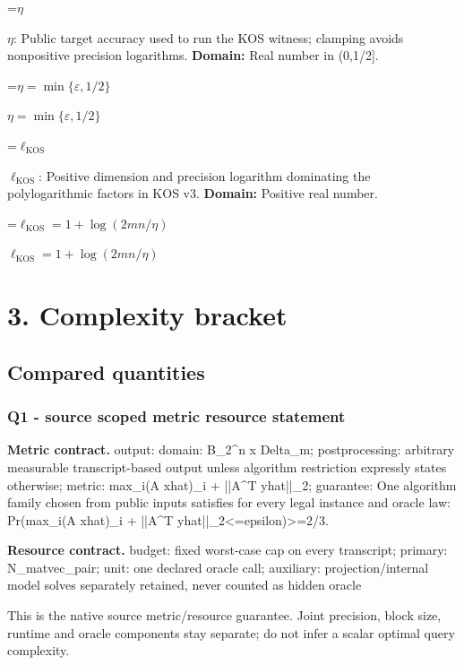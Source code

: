 \documentclass[10pt,a4paper]{article}
\newcommand{\AtlasMath}[1]{\par\begingroup\centering\setbox0=\hbox{$\displaystyle #1$}\ifdim\wd0>1.4\linewidth\typeout{ATLAS WIDE FORMULA: \the\wd0}\fi\ifdim\wd0>\linewidth\resizebox{\linewidth}{!}{\box0}\else\box0\fi\par\endgroup}
\newcommand{\AtlasInlineMath}[1]{\begingroup\setbox0=\hbox{$#1$}\ifdim\wd0>.4\linewidth\endgroup\AtlasMath{#1}\else\endgroup$#1$\fi}
\begin{document}
\AtlasInlineMath{\eta}: Public target accuracy used to run the KOS witness; clamping avoids nonpositive precision logarithms. \textbf{Domain:} Real number in (0,1/2].



\AtlasInlineMath{\eta=\min\{\varepsilon,1/2\}}



\AtlasInlineMath{\ell_{\mathrm{KOS}}}: Positive dimension and precision logarithm dominating the polylogarithmic factors in KOS v3. \textbf{Domain:} Positive real number.



\AtlasInlineMath{\ell_{\mathrm{KOS}}=1+\log(2mn/\eta)}



\section{3. Complexity bracket}


\subsection{Compared quantities}


\subsubsection{Q1 - source scoped metric resource statement}


\textbf{Metric contract.} output: domain: B\_2\textasciicircum{}n x Delta\_m; postprocessing: arbitrary measurable transcript-based output unless algorithm restriction expressly states otherwise; metric: max\_i(A xhat)\_i + ||A\textasciicircum{}T yhat||\_2; guarantee: One algorithm family chosen from public inputs satisfies for every legal instance and oracle law: Pr(max\_i(A xhat)\_i + ||A\textasciicircum{}T yhat||\_2<=epsilon)>=2/3.



\textbf{Resource contract.} budget: fixed worst-case cap on every transcript; primary: N\_matvec\_pair; unit: one declared oracle call; auxiliary: projection/internal model solves separately retained, never counted as hidden oracle



This is the native source metric/resource guarantee. Joint precision, block size, runtime and oracle components stay separate; do not infer a scalar optimal query complexity.
\end{document}

